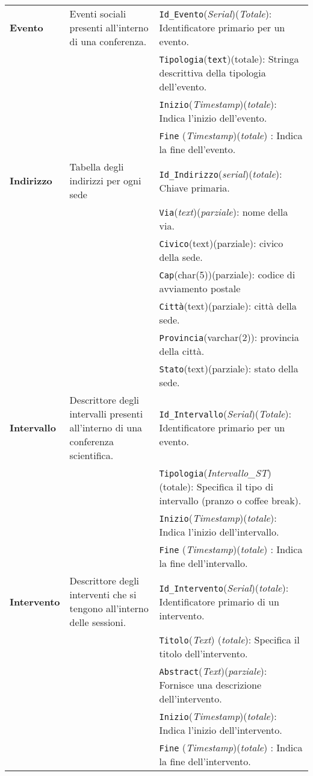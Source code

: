 \begin{longtable}{|p{}|p{}|p{}|}
	\textbf{Evento} & Eventi sociali presenti all'interno di una conferenza.&  \texttt{Id\_Evento}(\textit{Serial})(\textit{Totale}): Identificatore primario per un evento. \\
	& & \texttt{Tipologia}(\texttt{text})(totale): Stringa descrittiva della tipologia dell'evento. \\
	& & \texttt{Inizio}(\textit{Timestamp})(\textit{totale}): Indica l'inizio dell'evento. \\
	& & \texttt{Fine} (\textit{Timestamp})(\textit{totale}) : Indica la fine dell'evento. \\	\hline
	
	\textbf{Indirizzo} & Tabella degli indirizzi per ogni sede & \texttt{Id\_Indirizzo}(\textit{serial})(\textit{totale}): Chiave primaria. \\
	& & \texttt{Via}(\textit{text})(\textit{parziale}): nome della via. \\
	& & \texttt{Civico}(text)(parziale): civico della sede. \\
	& & \texttt{Cap}(char(5))(parziale): codice di avviamento postale \\
	& & \texttt{Città}(text)(parziale): città della sede. \\
	& & \texttt{Provincia}(varchar(2)): provincia della città. \\
	& & \texttt{Stato}(text)(parziale): stato della sede. \\ \hline
	
	\textbf{Intervallo} & Descrittore degli intervalli presenti all'interno di una conferenza scientifica.&  \texttt{Id\_Intervallo}(\textit{Serial})(\textit{Totale}): Identificatore primario per un evento. \\
	& & \texttt{Tipologia}(\textit{Intervallo\_ST})(totale): Specifica il tipo di intervallo (pranzo o coffee break).  \\
	& & \texttt{Inizio}(\textit{Timestamp})(\textit{totale}): Indica l'inizio dell'intervallo. \\
	& & \texttt{Fine} (\textit{Timestamp})(\textit{totale}) : Indica la fine dell'intervallo. \\ \hline
	
	\textbf{Intervento} & Descrittore degli interventi che si tengono all'interno delle sessioni. & \texttt{Id\_Intervento}(\textit{Serial})(\textit{totale}): Identificatore primario di un intervento. \\
	& & \texttt{Titolo}(\textit{Text}) (\textit{totale}): Specifica il titolo dell'intervento. \\
	& & \texttt{Abstract}(\textit{Text})(\textit{parziale}): Fornisce una descrizione dell'intervento. \\
	& & \texttt{Inizio}(\textit{Timestamp})(\textit{totale}): Indica l'inizio dell'intervento. \\
	& & \texttt{Fine} (\textit{Timestamp})(\textit{totale}) : Indica la fine dell'intervento. \\	\hline
	

\end{longtable}
